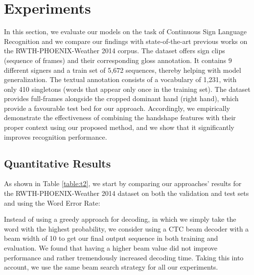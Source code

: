 \documentclass[a4paper,conference]{IEEEtran}
\begin{document}
\section{Experiments}

In this section, we evaluate our models on the task of Continuous Sign Language Recognition and we compare our findings with state-of-the-art previous works on the RWTH-PHOENIX-Weather 2014 corpus. The dataset offers sign clips (sequence of frames) and their corresponding gloss annotation. It contains 9 different signers and a train set of 5,672 sequences, thereby helping with model generalization. The textual annotation consists of a vocabulary  of 1,231, with only 410 singletons (words that appear only once in the training set). The dataset provides full-frames alongside the cropped dominant hand (right hand), which provide a favourable test bed for our approach. Accordingly, we empirically demonstrate the effectiveness of combining the handshape features with their proper context using our proposed method, and we show that it significantly improves recognition performance. 

\subsection{Quantitative Results}

As shown in Table \ref{table:t2}, we start by comparing our approaches' results for the RWTH-PHOENIX-Weather 2014 dataset on both the validation and test sets and using the Word Error Rate: 



Instead of using a greedy approach for decoding, in which we simply take the word with the highest probability, we consider using a CTC beam decoder with a beam width of 10 to get our final output sequence in both training and evaluation. We found that having a higher beam value did not improve performance and rather tremendously increased decoding time. Taking this into account, we use the same beam search strategy for all our experiments.  
\end{document}
